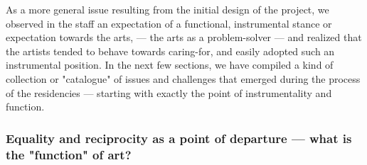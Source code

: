 \documentclass[authordate, empirical,issue]{jote-new-article}
\begin{document}
{	As a more general issue resulting from the initial design of the project, we observed in the staff an expectation of a functional, instrumental stance or expectation towards the arts, --- the arts as a problem-solver --- and realized that the artists tended to behave towards caring-for, and easily adopted such an instrumental position. In the next few sections, we have compiled a kind of collection or "catalogue" of issues and challenges that emerged during the process of the residencies --- starting with exactly the point of instrumentality and function.




	}


	\subsubsection{Equality and reciprocity as a point of departure --- what is the "function" of art?}
\end{document}
